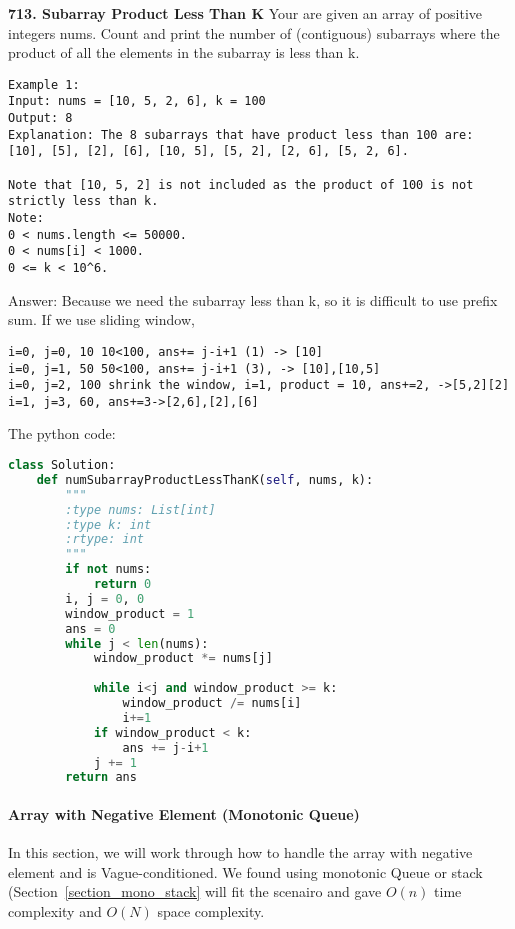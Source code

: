\documentclass[../main.tex]{subfiles}
\begin{document}
\begin{examples}[resume]
\item \textbf{713. Subarray Product Less Than K} Your are given an array of positive integers nums.
Count and print the number of (contiguous) subarrays where the product of all the elements in the subarray is less than k.
\begin{lstlisting}[numbers=none]
Example 1:
Input: nums = [10, 5, 2, 6], k = 100
Output: 8
Explanation: The 8 subarrays that have product less than 100 are: [10], [5], [2], [6], [10, 5], [5, 2], [2, 6], [5, 2, 6].

Note that [10, 5, 2] is not included as the product of 100 is not strictly less than k.
Note:
0 < nums.length <= 50000.
0 < nums[i] < 1000.
0 <= k < 10^6.
\end{lstlisting}

Answer: Because we need the subarray less than k, so it is difficult to use prefix sum. If we use sliding window,
\begin{lstlisting}
i=0, j=0, 10 10<100, ans+= j-i+1 (1) -> [10]
i=0, j=1, 50 50<100, ans+= j-i+1 (3), -> [10],[10,5]
i=0, j=2, 100 shrink the window, i=1, product = 10, ans+=2, ->[5,2][2]
i=1, j=3, 60, ans+=3->[2,6],[2],[6]
\end{lstlisting}
The python code:
\begin{lstlisting}[language = Python]
class Solution:
    def numSubarrayProductLessThanK(self, nums, k):
        """
        :type nums: List[int]
        :type k: int
        :rtype: int
        """
        if not nums:
            return 0
        i, j = 0, 0
        window_product = 1
        ans = 0
        while j < len(nums):
            window_product *= nums[j]
            
            while i<j and window_product >= k:
                window_product /= nums[i]               
                i+=1
            if window_product < k:
                ans += j-i+1            
            j += 1
        return ans
\end{lstlisting}
\end{examples}
\paragraph{Array with Negative Element (Monotonic Queue)}

In this section, we will work through how to handle the array with negative element and is Vague-conditioned. We found using monotonic Queue or stack (Section~\ref{section_mono_stack} will fit the scenairo and gave $O(n)$ time complexity and $O(N)$ space complexity. 
\end{document}
